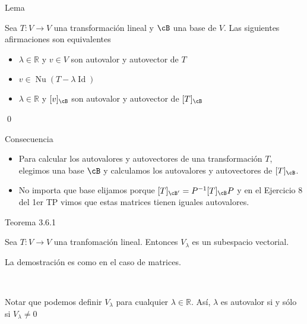 \documentclass[handout]{beamer} %
\newcommand{\Id}{\operatorname{Id}}
\newcommand{\R}{\mathbb R}
\begin{document}
\begin{frame}
	
	\begin{block}{Lema}
		
		Sea $T:V\longrightarrow V$ una transformación lineal y $\cB$ una base de $V$. Las siguientes afirmaciones son equivalentes\pause
		\begin{itemize}
			\item $\lambda\in\R$ y $v\in V$ son autovalor y autovector de $T$\pause
			\item $v\in\operatorname{Nu}(T-\lambda\Id)$\pause
			
			\item $\lambda\in\R$ y $[v]_\cB$ son autovalor y autovector de $[T]_\cB$
		\end{itemize}
	\end{block}\pause
	
	\qed
	
\end{frame}

\begin{frame}
	\begin{block}{Consecuencia}\pause
		\begin{itemize}
			\item Para calcular los autovalores y autovectores de una transformación $T$, elegimos una base $\cB$ y calculamos los autovalores y autovectores de $[T]_\cB$.\pause
			
			\item 
			No importa que base elijamos porque $[T]_{\cB'}=P^{-1}[T]_\cB P$ y en el Ejercicio 8 del 1er TP vimos que estas matrices tienen iguales autovalores.  
		\end{itemize}
	\end{block} 
\end{frame}


\begin{frame}
	\begin{block}{Teorema 3.6.1}
		
		Sea $T:V\longrightarrow V$ una tranfomación lineal. Entonces $V_\lambda$ es un subespacio vectorial.
	\end{block}\pause
	
	La demostración es como en el caso de matrices. 
	\pause
	
	\
	
	
	Notar que podemos definir $V_\lambda$ para cualquier $\lambda\in\R$. Así, $\lambda$ es autovalor si y sólo si $V_\lambda\neq0$ 
\end{frame}
\end{document}
